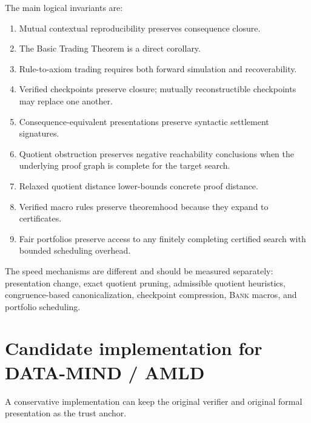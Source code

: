 \documentclass[11pt]{article}
\theoremstyle{definition}
\theoremstyle{remark}
\newcommand{\BANK}{\textsc{Bank}}
\begin{document}
The main logical invariants are:
\begin{enumerate}
\item Mutual contextual reproducibility preserves consequence closure.
\item The Basic Trading Theorem is a direct corollary.
\item Rule-to-axiom trading requires both forward simulation and recoverability.
\item Verified checkpoints preserve closure; mutually reconstructible checkpoints may replace one another.
\item Consequence-equivalent presentations preserve syntactic settlement signatures.
\item Quotient obstruction preserves negative reachability conclusions when the underlying proof graph is complete for the target search.
\item Relaxed quotient distance lower-bounds concrete proof distance.
\item Verified macro rules preserve theoremhood because they expand to certificates.
\item Fair portfolios preserve access to any finitely completing certified search with bounded scheduling overhead.
\end{enumerate}

The speed mechanisms are different and should be measured separately: presentation change, exact quotient pruning, admissible quotient heuristics, congruence-based canonicalization, checkpoint compression, \BANK{} macros, and portfolio scheduling.

\section{Candidate implementation for DATA-MIND / AMLD}
A conservative implementation can keep the original verifier and original formal presentation as the trust anchor.
\end{document}
